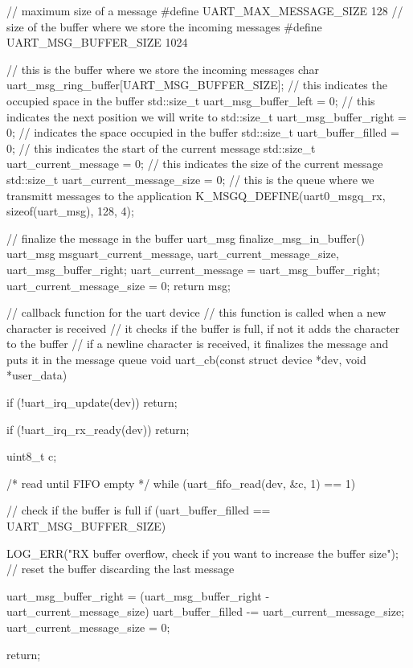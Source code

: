 \begin{cpp}
// maximum size of a message
#define UART_MAX_MESSAGE_SIZE 128
// size of the buffer where we store the incoming messages
#define UART_MSG_BUFFER_SIZE 1024

// this is the buffer where we store the incoming messages
char uart_msg_ring_buffer[UART_MSG_BUFFER_SIZE];
// this indicates the occupied space in the buffer
std::size_t uart_msg_buffer_left = 0;
// this indicates the next position we will write to
std::size_t uart_msg_buffer_right = 0;
// indicates the space occupied in the buffer
std::size_t uart_buffer_filled = 0;
// this indicates the start of the current message
std::size_t uart_current_message = 0;
// this indicates the size of the current message
std::size_t uart_current_message_size = 0;
// this is the queue where we transmitt messages to the application
K_MSGQ_DEFINE(uart0_msgq_rx, sizeof(uart_msg), 128, 4);

// finalize the message in the buffer
uart_msg finalize_msg_in_buffer()
{
    uart_msg msg{uart_current_message, uart_current_message_size, uart_msg_buffer_right};
    uart_current_message = uart_msg_buffer_right;
    uart_current_message_size = 0;
    return msg;
}

// callback function for the uart device
// this function is called when a new character is received
// it checks if the buffer is full, if not it adds the character to the buffer
// if a newline character is received, it finalizes the message and puts it in the message queue
void uart_cb(const struct device *dev, void *user_data)
{

    if (!uart_irq_update(dev))
    {
        return;
    }

    if (!uart_irq_rx_ready(dev))
    {
        return;
    }

    uint8_t c;

    /* read until FIFO empty */
    while (uart_fifo_read(dev, &c, 1) == 1)
    {

        // check if the buffer is full
        if (uart_buffer_filled == UART_MSG_BUFFER_SIZE)
        {
            LOG_ERR("RX buffer overflow, check if you want to increase the buffer size");
            // reset the buffer discarding the last message

            uart_msg_buffer_right = (uart_msg_buffer_right - uart_current_message_size) %
            uart_buffer_filled -= uart_current_message_size;
            uart_current_message_size = 0;

            return;
        }

}}
\end{cpp}
